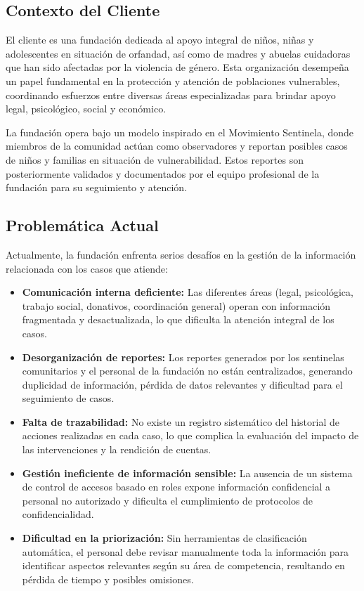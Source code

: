 \documentclass[12pt,letterpaper]{article}
\begin{document}
\subsection{Contexto del Cliente}

El cliente es una fundación dedicada al apoyo integral de niños, niñas y adolescentes en situación de orfandad, así como de madres y abuelas cuidadoras que han sido afectadas por la violencia de género. Esta organización desempeña un papel fundamental en la protección y atención de poblaciones vulnerables, coordinando esfuerzos entre diversas áreas especializadas para brindar apoyo legal, psicológico, social y económico.

La fundación opera bajo un modelo inspirado en el Movimiento Sentinela, donde miembros de la comunidad actúan como observadores y reportan posibles casos de niños y familias en situación de vulnerabilidad. Estos reportes son posteriormente validados y documentados por el equipo profesional de la fundación para su seguimiento y atención.

\subsection{Problemática Actual}

Actualmente, la fundación enfrenta serios desafíos en la gestión de la información relacionada con los casos que atiende:

\begin{itemize}
    \item \textbf{Comunicación interna deficiente:} Las diferentes áreas (legal, psicológica, trabajo social, donativos, coordinación general) operan con información fragmentada y desactualizada, lo que dificulta la atención integral de los casos.
    
    \item \textbf{Desorganización de reportes:} Los reportes generados por los sentinelas comunitarios y el personal de la fundación no están centralizados, generando duplicidad de información, pérdida de datos relevantes y dificultad para el seguimiento de casos.
    
    \item \textbf{Falta de trazabilidad:} No existe un registro sistemático del historial de acciones realizadas en cada caso, lo que complica la evaluación del impacto de las intervenciones y la rendición de cuentas.
    
    \item \textbf{Gestión ineficiente de información sensible:} La ausencia de un sistema de control de accesos basado en roles expone información confidencial a personal no autorizado y dificulta el cumplimiento de protocolos de confidencialidad.
    
    \item \textbf{Dificultad en la priorización:} Sin herramientas de clasificación automática, el personal debe revisar manualmente toda la información para identificar aspectos relevantes según su área de competencia, resultando en pérdida de tiempo y posibles omisiones.
\end{itemize}
\end{document}
